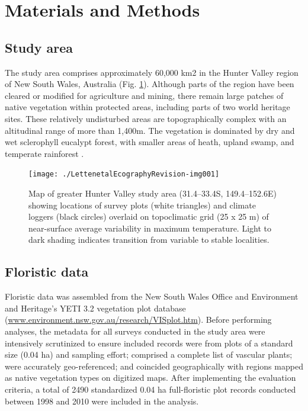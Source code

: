 \section{Materials and Methods}

\subsection{Study area}

The study area comprises approximately 60,000 km2 in the Hunter Valley region of New South Wales, Australia (Fig. \ref{fig:studyarea}). Although parts of the region have been cleared or modified for agriculture and mining, there remain large patches of native vegetation within protected areas, including parts of two world heritage sites. These relatively undisturbed areas are topographically complex with an altitudinal range of more than 1,400m. The vegetation is dominated by dry and wet sclerophyll eucalypt forest, with smaller areas of heath, upland swamp, and temperate rainforest \citep{Keith2004}.

\begin{figure}[H]
\centering
\texttt{[image: ./LettenetalEcographyRevision-img001]}
\caption{Map of greater Hunter Valley study area (31.4--33.4{\textdegree}S, 149.4--152.6{\textdegree}E) showing locations of survey plots (white triangles) and climate loggers (black circles) overlaid on topoclimatic grid (25 x 25 m) of near-surface average variability in maximum temperature. Light to dark shading indicates transition from variable to stable localities. }
\label{fig:studyarea}
\end{figure}


\subsection{Floristic data}

Floristic data was assembled from the New South Wales Office and Environment and Heritage's YETI 3.2 vegetation plot database (\url{www.environment.nsw.gov.au/research/VISplot.htm}). Before performing analyses, the metadata for all surveys conducted in the study area were intensively scrutinized to ensure included records were from plots of a standard size (0.04 ha) and sampling effort; comprised a complete list of vascular plants; were accurately geo-referenced; and coincided geographically with regions mapped as native vegetation types on digitized maps. After implementing the evaluation criteria, a total of 2490 standardized 0.04 ha full-floristic plot records conducted between 1998 and 2010 were included in the analysis. 

